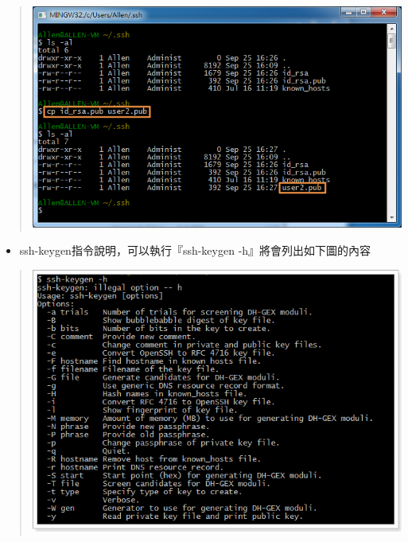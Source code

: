 \documentclass[letterpaper,10pt,english]{sphinxmanual}
\begin{document}
\begin{quote}

\includegraphics{gitBash-003.png}
\end{quote}
\begin{itemize}
\item {} 
ssh-keygen指令說明，可以執行『ssh-keygen -h』將會列出如下圖的內容

\end{itemize}
\begin{quote}

\includegraphics{ssh-keygen-help.png}
\end{quote}
\end{document}
